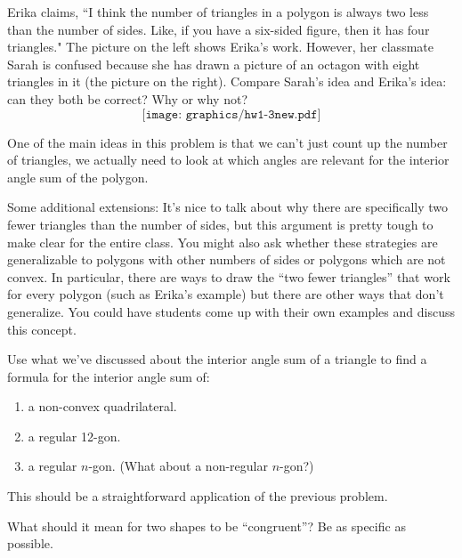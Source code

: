 \documentclass[nooutcomes]{ximera}
\begin{document}
\begin{problem}
Erika claims, ``I think the number of triangles in a polygon is always two less than the number of sides.  Like, if you have a six-sided figure, then it has four triangles."  The picture on the left shows Erika's work.  However, her classmate Sarah is confused because she has drawn a picture of an octagon with eight triangles in it (the picture on the right). Compare Sarah's idea and Erika's idea: can they both be correct? Why or why not?
		\[
		\texttt{[image: graphics/hw1-3new.pdf]}
		\]
		
		\begin{instructorNotes}
		One of the main ideas in this problem is that we can't just count up the number of triangles, we actually need to look at which angles are relevant for the interior angle sum of the polygon.
		
		Some additional extensions:  It's nice to talk about why there are specifically two fewer triangles than the number of sides, but this argument is pretty tough to make clear for the entire class.  You might also ask whether these strategies are generalizable to polygons with other numbers of sides or polygons which are not convex.  In particular, there are ways to draw the ``two fewer triangles'' that work for every polygon (such as Erika's example) but there are other ways that don't generalize.  You could have students come up with their own examples and discuss this concept.
		\end{instructorNotes}
\end{problem}

\begin{problem}
Use what we've discussed about the interior angle sum of a triangle to find a formula for the interior angle sum of:
\begin{enumerate}
    \item a non-convex quadrilateral.
    \item a regular 12-gon.
    \item a regular $n$-gon. (What about a non-regular $n$-gon?)
\end{enumerate}

\begin{instructorNotes}
This should be a straightforward application of the previous problem.

\end{instructorNotes}
\end{problem}

\newpage
\begin{problem}
What should it mean for two shapes to be ``congruent''?  Be as specific as possible.
\end{problem}
\end{document}
